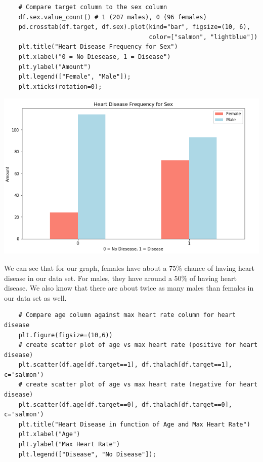 \documentclass[11pt, a4paper]{article}
\begin{document}
\begin{spacing}{1.1}
\begin{lstlisting}
	# Compare target column to the sex column
	df.sex.value_count() # 1 (207 males), 0 (96 females)
	pd.crosstab(df.target, df.sex).plot(kind="bar",	figsize=(10, 6),
	                                    color=["salmon", "lightblue"])
	plt.title("Heart Disease Frequency for Sex")
	plt.xlabel("0 = No Diesease, 1 = Disease")
	plt.ylabel("Amount")
	plt.legend(["Female", "Male"]);
	plt.xticks(rotation=0); \end{lstlisting} \vspace*{1mm}
	\begin{minipage}[c]{9cm}
	\includegraphics[scale=.5]{crosstab_hd}
	\end{minipage}
	\begin{minipage}[c]{8cm}
	We can see that for our graph, females have about a 75\% chance of having heart disease in our data set. For males, they have around a 50\% of having heart disease. We also know that there are about twice as many males than females in our data set as well.
	\end{minipage}
	\begin{lstlisting}
	# Compare age column against max heart rate column for heart disease
	plt.figure(figsize=(10,6))
	# create scatter plot of age vs max heart rate (positive for heart disease)
	plt.scatter(df.age[df.target==1], df.thalach[df.target==1], c='salmon')
	# create scatter plot of age vs max heart rate (negative for heart disease)
	plt.scatter(df.age[df.target==0], df.thalach[df.target==0], c='salmon')
	plt.title("Heart Disease in function of Age and Max Heart Rate")
	plt.xlabel("Age")
	plt.ylabel("Max Heart Rate")
	plt.legend(["Disease", "No Disease"]); \end{lstlisting} \vspace*{1mm}
	\begin{minipage}[c]{9cm}

\end{minipage}
\end{spacing}
\end{document}
